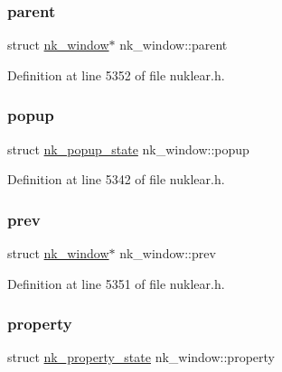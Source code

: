\subsubsection{\texorpdfstring{parent}{parent}}
{\footnotesize\ttfamily struct \mbox{\hyperlink{structnk__window}{nk\+\_\+window}}$\ast$ nk\+\_\+window\+::parent}



Definition at line 5352 of file nuklear.\+h.

\mbox{\label{structnk__window_aa5a5f13e1d678d56725eab9a0a130acd}} 
\subsubsection{\texorpdfstring{popup}{popup}}
{\footnotesize\ttfamily struct \mbox{\hyperlink{structnk__popup__state}{nk\+\_\+popup\+\_\+state}} nk\+\_\+window\+::popup}



Definition at line 5342 of file nuklear.\+h.

\mbox{\label{structnk__window_a467a7e9298d91e5226774ff6061a73b5}} 
\subsubsection{\texorpdfstring{prev}{prev}}
{\footnotesize\ttfamily struct \mbox{\hyperlink{structnk__window}{nk\+\_\+window}}$\ast$ nk\+\_\+window\+::prev}



Definition at line 5351 of file nuklear.\+h.

\mbox{\label{structnk__window_ab9fedd0b171796592daf5fa41a08bcea}} 
\subsubsection{\texorpdfstring{property}{property}}
{\footnotesize\ttfamily struct \mbox{\hyperlink{structnk__property__state}{nk\+\_\+property\+\_\+state}} nk\+\_\+window\+::property}



